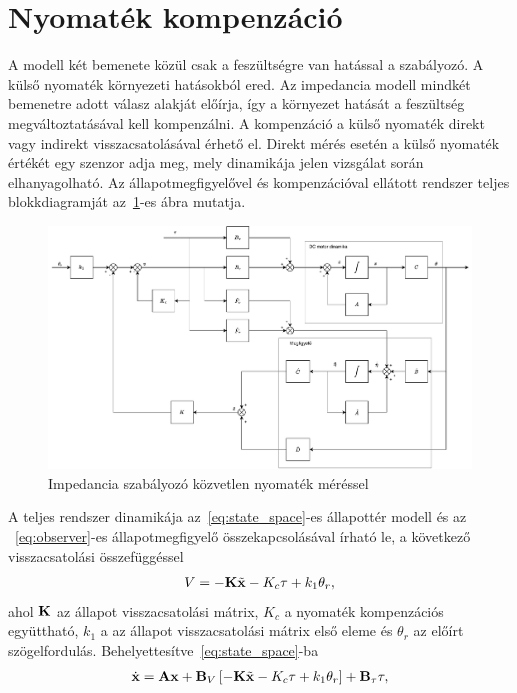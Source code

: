 \section{Nyomaték kompenzáció}
A modell két bemenete közül csak a feszültségre van hatással a 
szabályozó. A külső nyomaték környezeti hatásokból ered. Az impedancia 
modell mindkét bemenetre adott válasz alakját előírja, így a környezet 
hatását a feszültség megváltoztatásával kell kompenzálni. A kompenzáció
a külső nyomaték direkt vagy indirekt visszacsatolásával érhető el.
Direkt mérés esetén a külső nyomaték értékét egy szenzor adja meg, 
mely dinamikája jelen vizsgálat során elhanyagolható. Az
állapotmegfigyelővel és kompenzációval ellátott rendszer teljes 
blokkdiagramját az~\ref{fig:block_diagram_direct_compensation}-es ábra mutatja.
\begin{figure}[ht]
    \begin{center}
    \includegraphics[width=\textwidth]{images/compensated_position_control_torque.drawio.pdf}
    \caption{Impedancia szabályozó közvetlen nyomaték méréssel}\label{fig:block_diagram_direct_compensation}
    \end{center}
\end{figure}
A teljes rendszer dinamikája az~\eqref{eq:state_space}-es állapottér modell és az ~\eqref{eq:observer}-es 
állapotmegfigyelő összekapcsolásával írható le, a következő visszacsatolási összefüggéssel
\begin{align}
    V = -\mathbf{K} \tilde{\mathbf{x}} -K_c \tau + k_1 \theta_r,
\end{align}
ahol $\mathbf{K}$ az állapot visszacsatolási mátrix, $K_c$ a nyomaték kompenzációs együttható,
$k_1$ a az állapot visszacsatolási mátrix első eleme és $\theta_r$ az előírt szögelfordulás.
Behelyettesítve~\eqref{eq:state_space}-ba
\begin{align}\label{eq:state_control_law_subs}
    \dot{\mathbf{x}} = \mathbf{A} \mathbf{x} + \mathbf{B}_V\left[-\mathbf{K} \tilde{\mathbf{x}} -K_c \tau + k_1 \theta_r\right] + \mathbf{B}_\tau \tau,
\end{align}
